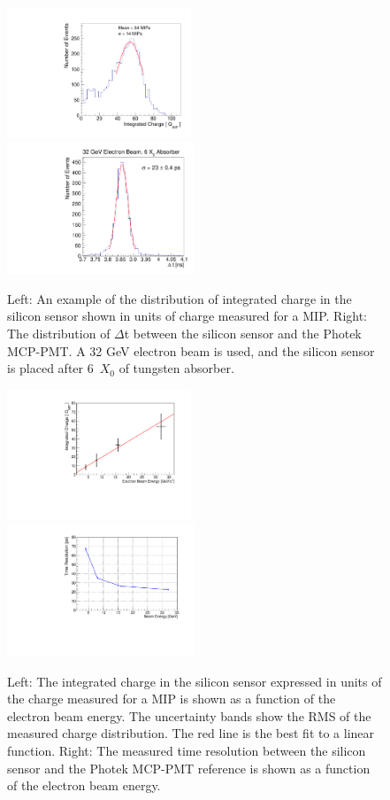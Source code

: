 \documentclass[12pt]{article}
\begin{document}
{\begin{figure}[htbp] 
\centering
\includegraphics[width=0.49\textwidth]{plots/Electron_6X0_32GeV_chargeMIP.pdf} 
\includegraphics[width=0.50\textwidth]{plots/deltaT_32GeV_6X0.pdf} 
\caption{ Left: An example of the distribution of integrated charge in the silicon
sensor shown in units of charge measured for a MIP. Right: The distribution
of $\Delta$t between the silicon sensor and the Photek MCP-PMT. A 32 GeV
electron beam is used, and the silicon sensor is placed after 6~$X_0$ of tungsten absorber.} 
\label{fig:ChargeDistributionExample}
\end{figure}

\begin{figure}[htbp] 
\centering
\includegraphics[width=0.49\textwidth]{plots/MIPVsEnergyAt6X0.pdf} 
\includegraphics[width=0.50\textwidth]{plots/SigmaT_vs_BeamEnergy_lin30Stamp.pdf} 
\caption{Left: The integrated charge in the silicon sensor expressed in units of the
charge measured for a MIP is shown as a function of the electron beam
energy. The uncertainty bands show the RMS of the measured charge distribution.
The red line is the best fit to a linear function. Right: The measured
time resolution between the silicon sensor and the Photek MCP-PMT reference is
shown as a function of the electron beam energy. } 
\label{fig:MIPVsEnergy} 
\end{figure} 

}
\end{document}
